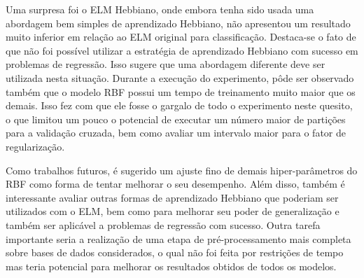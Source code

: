 \documentclass[conference]{IEEEtran}
\begin{document}
	Uma surpresa foi o ELM Hebbiano, onde embora tenha sido usada uma abordagem bem simples de aprendizado Hebbiano, não apresentou um resultado muito inferior em relação ao ELM original para classificação. Destaca-se o fato de que não foi possível utilizar a estratégia de aprendizado Hebbiano com sucesso em problemas de regressão. Isso sugere que uma abordagem diferente deve ser utilizada nesta situação. Durante a execução do experimento, pôde ser observado também que o modelo RBF possui um tempo de treinamento muito maior que os demais. Isso fez com que ele fosse o gargalo de todo o experimento neste quesito, o que limitou um pouco o potencial de executar um número maior de partições para a validação cruzada, bem como avaliar um intervalo maior para o fator de regularização. 
	
	Como trabalhos futuros, é sugerido um ajuste fino de demais hiper-parâmetros do RBF como forma de tentar melhorar o seu desempenho. Além disso, também é interessante avaliar outras formas de aprendizado Hebbiano que poderiam ser utilizados com o ELM, bem como para melhorar seu poder de generalização e também ser aplicável a problemas de regressão com sucesso. Outra tarefa importante seria a realização de uma etapa de pré-processamento mais completa sobre bases de dados considerados, o qual não foi feita por restrições de tempo mas teria potencial para melhorar os resultados obtidos de todos os modelos.
		


    
	
	
\end{document}

